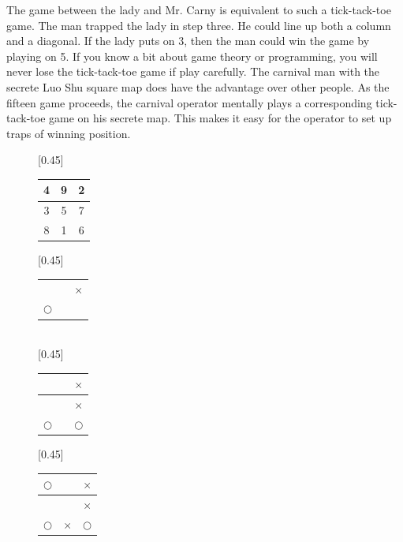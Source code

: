 \documentclass[UTF8]{article}
\begin{document}
The game between the lady and Mr. Carny is equivalent to such a tick-tack-toe game. The man trapped the lady in step three. He could line up both a column and a diagonal. If the lady puts on 3, then the man could win the game by playing on 5. If you know a bit about game theory or programming, you will never lose the tick-tack-toe game if play carefully. The carnival man with the secrete Luo Shu square map does have the advantage over other people. As the fifteen game proceeds, the carnival operator mentally plays a corresponding tick-tack-toe game on his secrete map. This makes it easy for the operator to set up traps of winning position.

\begin{figure}[htbp]
 \centering
 [0.45\linewidth]{
   \begin{tabular}{|c|c|c|}
   \hline
   4 & 9 & 2 \\
   \hline
   3 & 5 & 7 \\
   \hline
   8 & 1 & 6 \\
   \hline
   \end{tabular}
   \vspace{3mm}
 }
 [0.45\linewidth]{
   \begin{tabular}{c|c|c}
   &  & \\
   \hline
   &  & $\times$ \\
   \hline
   $\bigcirc$ & & \\
   \end{tabular}
   \vspace{3mm}
 } \vspace{3mm} \\
 [0.45\linewidth]{
   \begin{tabular}{c|c|c}
   &  & $\times$\\
   \hline
   &  & $\times$ \\
   \hline
   $\bigcirc$ & & $\bigcirc$ \\
   \end{tabular}
   \vspace{3mm}
 }
 [0.45\linewidth]{
   \begin{tabular}{c|c|c}
   $\bigcirc$ &  & $\times$\\
   \hline
   &  & $\times$ \\
   \hline
   $\bigcirc$ & $\times$ & $\bigcirc$ \\

\end{tabular}}
\end{figure}
\end{document}
